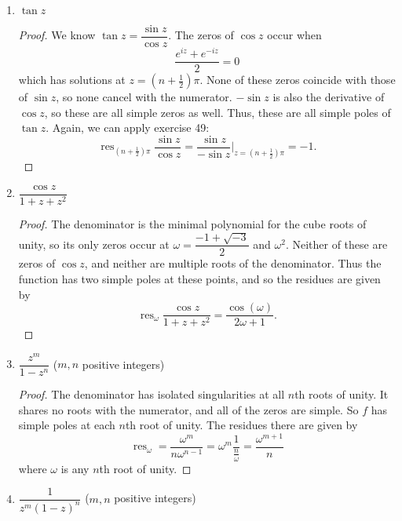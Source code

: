 \documentclass[10pt]{article}
\DeclareMathOperator*{\res}{res}
\begin{document}
\begin{enumerate}
\begin{enumerate}
\begin{proof}
Since the derivative of the denominator is $e^z$, which is nonzero, we know these are all simple zeros of the denominator.  Thus there is a removable singularity at $z = 0$ (since it ``cancels" with the numerator, i.e. the limit approaching this point is not infinity), and simple poles at $z = 2\pi i n$ for all $n \neq 0$.  The residue at $0$ is obviously 0.  Since the zeros of the denominator are simple at the poles, we can apply exercise 49 to find the residues there:
$$
\res\nolimits_{2\pi i n} \frac{z}{e^z - 1} = \frac{z}{(e^z - 1)'}\bigg|_{z=2\pi i n} = 2\pi i n.
$$
\end{proof}
\item $\tan z$
\begin{proof}
We know $\tan z = \dfrac{\sin z}{\cos z}$.  The zeros of $\cos z$ occur when
$$
\frac{e^{iz} + e^{-iz}}{2} = 0
$$
which has solutions at $z = (n + \frac12)\pi$.  None of these zeros coincide with those of $\sin z$, so none cancel with the numerator.  $-\sin z$ is also the derivative of $\cos z$, so these are all simple zeros as well.  Thus, these are all simple poles of $\tan z$.  Again, we can apply exercise 49:
$$
\res\nolimits_{(n + \frac12)\pi} \frac{\sin z}{\cos z}= \frac{\sin z}{-\sin z}\bigg|_{z=(n + \frac12)\pi} = -1.
$$
\end{proof}
\item $\dfrac{\cos z}{1 + z + z^2}$
\begin{proof}
The denominator is the minimal polynomial for the cube roots of unity, so its only zeros occur at $\omega = \dfrac{-1 + \sqrt{-3}}{2}$ and $\omega^2$.  Neither of these are zeros of $\cos z$, and neither are multiple roots of the denominator.  Thus the function has two simple poles at these points, and so the residues are given by
$$
\res\nolimits_{\omega} \dfrac{\cos z}{1 + z + z^2} = \frac{\cos(\omega)}{2\omega + 1}.
$$
\end{proof}
\item $\dfrac{z^m}{1-z^n}$ ($m,n$ positive integers)
\begin{proof}
The denominator has isolated singularities at all $n$th roots of unity.  It shares no roots with the numerator, and all of the zeros are simple.  So $f$ has simple poles at each $n$th root of unity.  The residues there are given by
$$
\res\nolimits_{\omega} = \frac{\omega^m}{n\omega^{n-1}} = \omega^m \frac{1}{\frac{n}{\omega}} = \frac{\omega^{m+1}}{n}
$$
where $\omega$ is any $n$th root of unity.
\end{proof}
\item $\dfrac{1}{z^m(1-z)^n}$ ($m,n$ positive integers)

\end{enumerate}
\end{enumerate}
\end{document}
